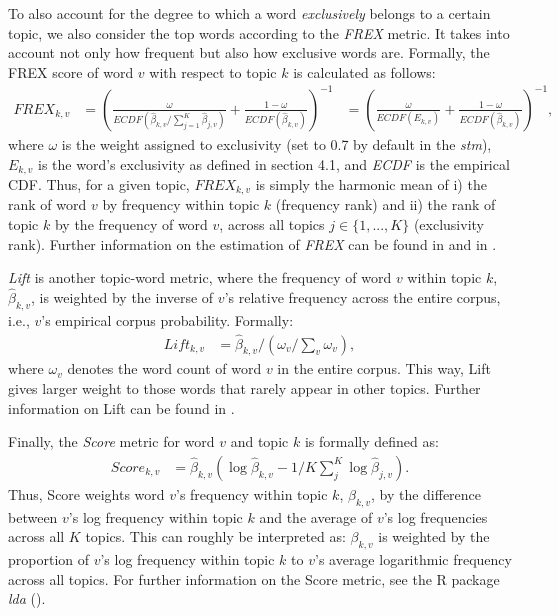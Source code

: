 \documentclass[12pt]{article}
\begin{document}
To also account for the degree to which a word \textit{exclusively} belongs to a certain topic, we also consider the top words according to the \textit{FREX} metric. It takes into account not only how frequent but also how exclusive words are. Formally, the FREX score of word $v$ with respect to topic $k$ is calculated as follows:
\begin{align*}
FREX_{k,v} &= (\frac{\omega}{ECDF(\hat{\beta}_{k,v}/\sum_{j=1}^{K}\hat{\beta}_{j,v})} + \frac{1-\omega}{ECDF(\hat{\beta}_{k,v})})^{-1} &= (\frac{\omega}{ECDF(E_{k,v})} + \frac{1-\omega}{ECDF(\hat{\beta}_{k,v})})^{-1},
\end{align*}
where $\omega$ is the weight  assigned to exclusivity (set to 0.7 by default in the \textit{stm}), $E_{k,v}$ is the word's exclusivity as defined in section 4.1, and \textit{ECDF} is the empirical CDF. Thus, for a given topic, $FREX_{k,v}$ is simply the harmonic mean of i) the rank of word $v$ by frequency within topic $k$ (frequency rank) and ii) the rank of topic $k$ by the frequency of word $v$, across all topics $j \in \{1,...,K\}$ (exclusivity rank). Further information on the estimation of \textit{FREX} can be found in \cite{stm} and in \cite{bischof2012summarizing}.

\textit{Lift} is another topic-word metric, where the frequency of word $v$ within topic $k$,  $\hat{\beta}_{k,v}$, is weighted by the inverse of $v$'s relative frequency across the entire corpus, i.e., $v$'s empirical corpus probability. Formally:
\begin{align*}
Lift_{k,v} &= \hat{\beta}_{k,v}/(\omega_{v}/\sum_{v}\omega_{v}),
\end{align*}
where $\omega_{v}$ denotes the word count of word $v$ in the entire corpus. This way, Lift gives larger weight to those words that rarely appear in other topics. Further information on Lift can be found in \cite{taddy2012estimation}.

Finally, the \textit{Score} metric for word $v$ and topic $k$ is formally defined as:
\begin{align*}
Score_{k,v} &= \hat{\beta}_{k,v}(\log\hat{\beta}_{k,v} - 1/K\sum_{j}^{K}\log\hat{\beta}_{j,v}).
\end{align*}
Thus, Score weights word $v$'s frequency within topic $k$, $\beta_{k,v}$, by the difference between $v$'s log frequency within topic $k$ and the average of $v$'s log frequencies across all $K$ topics. This can roughly be interpreted as: $\beta_{k,v}$ is weighted by the proportion of $v$'s log frequency within topic $k$ to $v$'s average logarithmic frequency across all topics. For further information on the Score metric, see the R package \textit{lda} (\citealp{chang2010package}).
\end{document}
